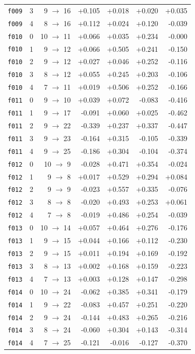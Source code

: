 \documentclass[11pt]{article}
\begin{document}
\begin{table}[htbp]
\begin{tabular}{llrrrrr}
\texttt{f009} & 3 & 9 $\to$ 16 & +0.105 & +0.018 & +0.020 & +0.035 \\
\texttt{f009} & 4 & 8 $\to$ 16 & +0.112 & +0.024 & +0.120 & -0.039 \\
\texttt{f010} & 0 & 10 $\to$ 11 & +0.066 & +0.035 & +0.234 & -0.000 \\
\texttt{f010} & 1 & 9 $\to$ 12 & +0.066 & +0.505 & +0.241 & -0.150 \\
\texttt{f010} & 2 & 9 $\to$ 12 & +0.027 & +0.046 & +0.252 & -0.116 \\
\texttt{f010} & 3 & 8 $\to$ 12 & +0.055 & +0.245 & +0.203 & -0.106 \\
\texttt{f010} & 4 & 7 $\to$ 11 & +0.019 & +0.506 & +0.252 & -0.166 \\
\texttt{f011} & 0 & 9 $\to$ 10 & +0.039 & +0.072 & -0.083 & -0.416 \\
\texttt{f011} & 1 & 9 $\to$ 17 & -0.091 & +0.060 & +0.025 & -0.462 \\
\texttt{f011} & 2 & 9 $\to$ 22 & -0.339 & +0.237 & +0.337 & -0.447 \\
\texttt{f011} & 3 & 9 $\to$ 23 & -0.164 & +0.315 & -0.105 & -0.339 \\
\texttt{f011} & 4 & 9 $\to$ 25 & -0.186 & +0.304 & -0.104 & -0.374 \\
\texttt{f012} & 0 & 10 $\to$ 9 & -0.028 & +0.471 & +0.354 & -0.024 \\
\texttt{f012} & 1 & 9 $\to$ 8 & +0.017 & +0.529 & +0.294 & +0.084 \\
\texttt{f012} & 2 & 9 $\to$ 9 & -0.023 & +0.557 & +0.335 & -0.076 \\
\texttt{f012} & 3 & 8 $\to$ 8 & -0.020 & +0.493 & +0.253 & +0.061 \\
\texttt{f012} & 4 & 7 $\to$ 8 & -0.019 & +0.486 & +0.254 & -0.039 \\
\texttt{f013} & 0 & 10 $\to$ 14 & +0.057 & +0.464 & +0.276 & -0.176 \\
\texttt{f013} & 1 & 9 $\to$ 15 & +0.044 & +0.166 & +0.112 & -0.230 \\
\texttt{f013} & 2 & 9 $\to$ 15 & +0.011 & +0.194 & +0.169 & -0.192 \\
\texttt{f013} & 3 & 8 $\to$ 13 & +0.002 & +0.168 & +0.159 & -0.223 \\
\texttt{f013} & 4 & 7 $\to$ 13 & +0.003 & +0.128 & +0.147 & -0.298 \\
\texttt{f014} & 0 & 10 $\to$ 24 & -0.062 & +0.385 & +0.341 & -0.179 \\
\texttt{f014} & 1 & 9 $\to$ 22 & -0.083 & +0.457 & +0.251 & -0.220 \\
\texttt{f014} & 2 & 9 $\to$ 24 & -0.144 & +0.483 & +0.265 & -0.216 \\
\texttt{f014} & 3 & 8 $\to$ 24 & -0.060 & +0.304 & +0.143 & -0.314 \\
\texttt{f014} & 4 & 7 $\to$ 25 & -0.121 & -0.016 & -0.127 & -0.370 \\
\bottomrule
\end{tabular}
\end{table}
\end{document}
